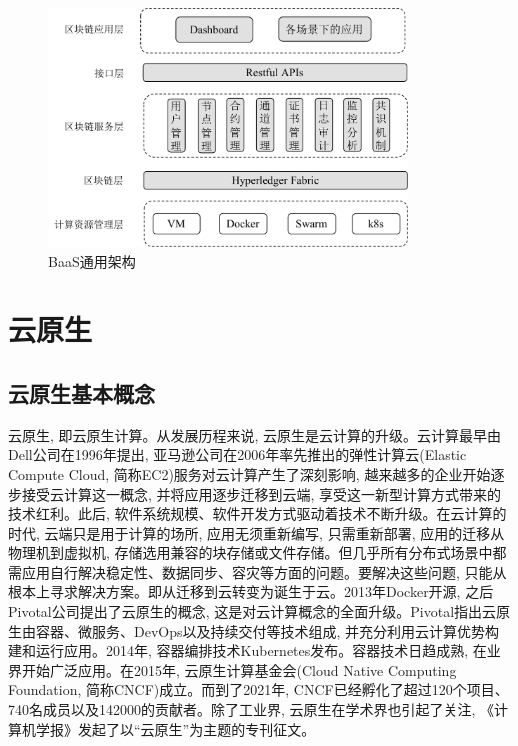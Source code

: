 \begin{figure}[h] %
    \centering %
    \includegraphics[width=0.85\textwidth]{FIGs/chapter2/BaaS_Architecture.pdf} %
    \caption{BaaS通用架构} %
    \label{BaaS_Architecture} %
\end{figure}%

\section{云原生}\label{section: cloud_native}

\subsection{云原生基本概念}

云原生, 即云原生计算。从发展历程来说, 云原生是云计算的升级。云计算最早由Dell公司在1996年提出\cite{ZHANG20121791}, 亚马逊公司在2006年率先推出的弹性计算云(Elastic Compute Cloud, 简称EC2)服务对云计算产生了深刻影响, 越来越多的企业开始逐步接受云计算这一概念, 并将应用逐步迁移到云端, 享受这一新型计算方式带来的技术红利。此后, 软件系统规模、软件开发方式驱动着技术不断升级。在云计算的时代, 云端只是用于计算的场所, 应用无须重新编写, 只需重新部署, 应用的迁移从物理机到虚拟机, 存储选用兼容的块存储或文件存储。但几乎所有分布式场景中都需应用自行解决稳定性、数据同步、容灾等方面的问题。要解决这些问题, 只能从根本上寻求解决方案。即从迁移到云转变为诞生于云。2013年Docker开源, 之后Pivotal公司提出了云原生的概念, 这是对云计算概念的全面升级。Pivotal指出云原生由容器、微服务、DevOps以及持续交付等技术\cite{WhatisCloudNative}组成, 并充分利用云计算优势构建和运行应用。2014年, 容器编排技术Kubernetes发布。容器技术日趋成熟, 在业界开始广泛应用。在2015年, 
云原生计算基金会(Cloud Native Computing Foundation, 简称CNCF)成立。而到了2021年, CNCF已经孵化了超过120个项目、740名成员以及142000的贡献者\footnotemark[1]。除了工业界, 云原生在学术界也引起了关注, 《计算机学报》发起了以“云原生”为主题的专刊征文\footnotemark[2]。

